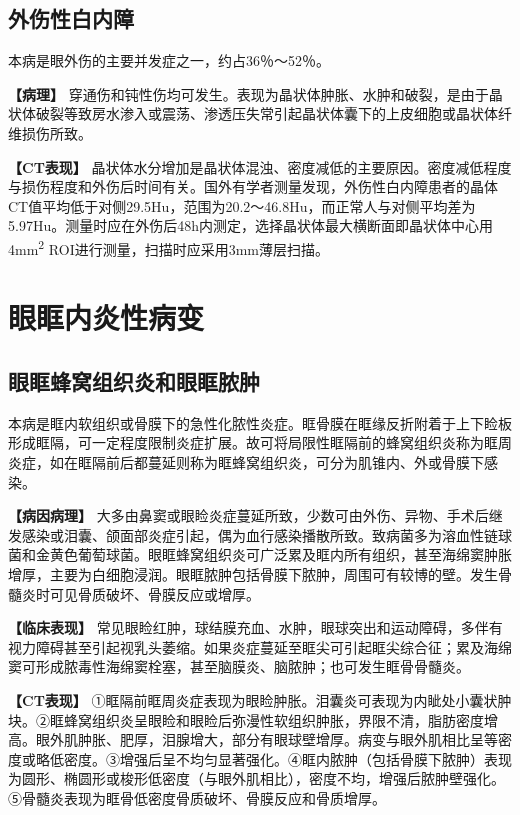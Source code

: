 \subsection{外伤性白内障}

本病是眼外伤的主要并发症之一，约占36％～52％。

\textbf{【病理】}
穿通伤和钝性伤均可发生。表现为晶状体肿胀、水肿和破裂，是由于晶状体破裂等致房水渗入或震荡、渗透压失常引起晶状体囊下的上皮细胞或晶状体纤维损伤所致。

\textbf{【CT表现】}
晶状体水分增加是晶状体混浊、密度减低的主要原因。密度减低程度与损伤程度和外伤后时间有关。国外有学者测量发现，外伤性白内障患者的晶体CT值平均低于对侧29.5Hu，范围为20.2～46.8Hu，而正常人与对侧平均差为5.97Hu。测量时应在外伤后48h内测定，选择晶状体最大横断面即晶状体中心用4mm\textsuperscript{2}
ROI进行测量，扫描时应采用3mm薄层扫描。

\section{眼眶内炎性病变}

\subsection{眼眶蜂窝组织炎和眼眶脓肿}

本病是眶内软组织或骨膜下的急性化脓性炎症。眶骨膜在眶缘反折附着于上下睑板形成眶隔，可一定程度限制炎症扩展。故可将局限性眶隔前的蜂窝组织炎称为眶周炎症，如在眶隔前后都蔓延则称为眶蜂窝组织炎，可分为肌锥内、外或骨膜下感染。

\textbf{【病因病理】}
大多由鼻窦或眼睑炎症蔓延所致，少数可由外伤、异物、手术后继发感染或泪囊、颌面部炎症引起，偶为血行感染播散所致。致病菌多为溶血性链球菌和金黄色葡萄球菌。眼眶蜂窝组织炎可广泛累及眶内所有组织，甚至海绵窦肿胀增厚，主要为白细胞浸润。眼眶脓肿包括骨膜下脓肿，周围可有较博的壁。发生骨髓炎时可见骨质破坏、骨膜反应或增厚。

\textbf{【临床表现】}
常见眼睑红肿，球结膜充血、水肿，眼球突出和运动障碍，多伴有视力障碍甚至引起视乳头萎缩。如果炎症蔓延至眶尖可引起眶尖综合征；累及海绵窦可形成脓毒性海绵窦栓塞，甚至脑膜炎、脑脓肿；也可发生眶骨骨髓炎。

\textbf{【CT表现】}
①眶隔前眶周炎症表现为眼睑肿胀。泪囊炎可表现为内眦处小囊状肿块。②眶蜂窝组织炎呈眼睑和眼睑后弥漫性软组织肿胀，界限不清，脂肪密度增高。眼外肌肿胀、肥厚，泪腺增大，部分有眼球壁增厚。病变与眼外肌相比呈等密度或略低密度。③增强后呈不均匀显著强化。④眶内脓肿（包括骨膜下脓肿）表现为圆形、椭圆形或梭形低密度（与眼外肌相比），密度不均，增强后脓肿壁强化。⑤骨髓炎表现为眶骨低密度骨质破坏、骨膜反应和骨质增厚。

